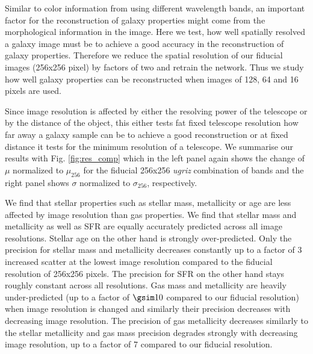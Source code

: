 \documentclass[conference]{IEEEtran}
\begin{document}
Similar to color information from using different wavelength bands, an important factor for the reconstruction of galaxy properties might come from the morphological information in the image. 
Here we test, how well spatially resolved a galaxy image must be to achieve a good accuracy in the reconstruction of galaxy properties. Therefore we reduce the spatial resolution of our fiducial images (256x256 pixel) by factors of two and retrain the network. Thus we study how well galaxy properties can be reconstructed when images of 128, 64 and 16 pixels are used. 

Since image resolution is affected by either the resolving power of the telescope or by the distance of the object, this either tests fat fixed telescope resolution how far away a galaxy sample can be to achieve a good reconstruction or at fixed distance it tests for the minimum resolution of a telescope.
We summarise our results with Fig. \ref{fig:res_comp} which in the left panel again shows the change of $\mu$ normalized to $\mu_{256}$ for the fiducial 256x256 \emph{ugriz} combination of bands and the right panel shows $\sigma$ normalized to $\sigma_{256}$, respectively. 

We find that stellar properties such as stellar mass, metallicity or age are less affected by image resolution than gas properties. We find that stellar mass and metallicity as well as SFR are equally accurately predicted across all image resolutions. Stellar age on the other hand is strongly over-predicted. Only the precision for stellar mass and metallicity decreases constantly up to a factor of 3 increased scatter at the lowest image resolution compared to the fiducial resolution of 256x256 pixels. The precision for SFR on the other hand stays roughly constant across all resolutions. Gas mass and metallicity are heavily under-predicted (up to a factor of $\gsim10$ compared to our fiducial resolution) when image resolution is changed and similarly their precision decreases with decreasing image resolution. The precision of gas metallicity decreases similarly to the stellar metallicity and gas mass precision degrades strongly with decreasing image resolution, up to a factor of 7 compared to our fiducial resolution.
\end{document}
